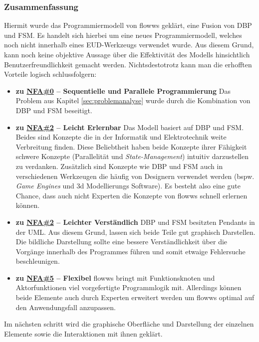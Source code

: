 \subsubsection{Zusammenfassung}
Hiermit wurde das Programmiermodell von flowws geklärt, eine Fusion von \ac{DBP} und \ac{FSM}. Es handelt sich hierbei um eine neues Programmiermodell, welches noch nicht innerhalb eines \ac{EUD}-Werkzeugs verwendet wurde. Aus diesem Grund, kann noch keine objektive Aussage über die Effektivität des Modells hinsichtlich Benutzerfreundlichkeit gemacht werden. Nichtsdestotrotz kann man die erhofften Vorteile logisch schlussfolgern:
\begin{itemize}
    \item \textbf{zu \hyperref[tab:NFA0]{NFA\#0} -- Sequentielle und Parallele Programmierung} Das Problem aus Kapitel \ref{sec:problemanalyse} wurde durch die Kombination von \ac{DBP} und \ac{FSM} beseitigt.
    \item \textbf{zu \hyperref[tab:NFA2]{NFA\#2} -- Leicht Erlernbar} Das Modell basiert auf \ac{DBP} und \ac{FSM}. Beides sind Konzepte die in der Informatik und Elektrotechnik weite Verbreitung finden. Diese Beliebtheit haben beide Konzepte ihrer Fähigkeit schwere Konzepte (Parallelität und \textit{State-Management}) intuitiv darzustellen zu verdanken. Zusätzlich sind Konzepte wie \ac{DBP} und \ac{FSM} auch in verschiedenen Werkzeugen die häufig von Designern verwendet werden (bspw. \textit{Game Engines} und 3d Modellierungs Software). Es besteht also eine gute Chance, dass auch nicht Experten die Konzepte von flowws schnell erlernen können.
    \item \textbf{zu \hyperref[tab:NFA2]{NFA\#2} -- Leichter Verständlich} \ac{DBP} und \ac{FSM} besitzten Pendants in der UML. Aus diesem Grund, lassen sich beide Teile gut graphisch Darstellen. Die bildliche Darstellung sollte eine bessere Verständlichkeit über die Vorgänge innerhalb des Programmes führen und somit etwaige Fehlersuche beschleunigen.
    \item \textbf{zu \hyperref[tab:NFA5]{NFA\#5} -- Flexibel} flowws bringt mit Funktionsknoten und Aktorfunktionen viel vorgefertigte Programmlogik mit. Allerdings können beide Elemente auch durch Experten erweitert werden um flowws optimal auf den Anwendungsfall anzupassen.
   
\end{itemize}

Im nächsten schritt wird die graphische Oberfläche und Darstellung der einzelnen Elemente sowie die Interaktionen mit ihnen geklärt.